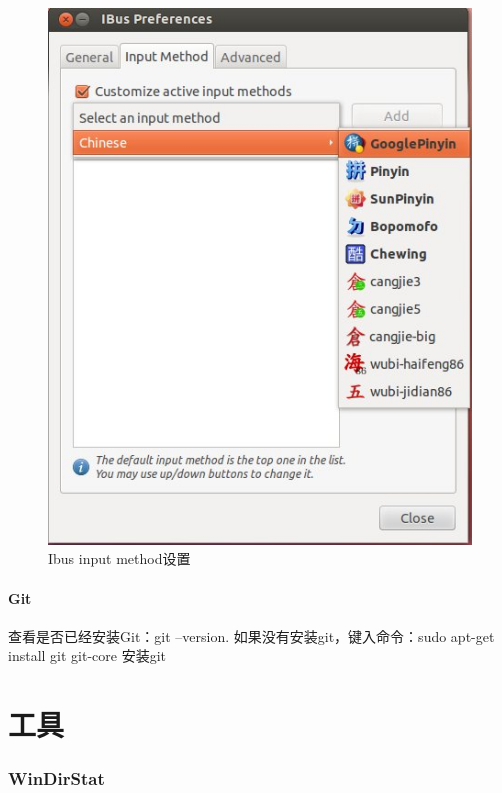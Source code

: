 \documentclass[paper=a4,fontsize=11pt]{article}
\begin{document}
\begin{enumerate}
		\begin{figure}[htbp]
			\centering
			\includegraphics[scale=0.7]{IbusSetupGooglePinyin.jpeg}
			\caption{Ibus input method设置}
			\label{IbusSetupGooglePinyin}
		\end{figure}
		
		
	\end{enumerate}
	
	\subsection{Git}
	
	查看是否已经安装Git：git --version.
	如果没有安装git，键入命令：sudo apt-get install git git-core 安装git
	
	
	
	
	
	\clearpage
		
	\part{工具}
	
	\clearpage
	
	\section{WinDirStat}
	
\end{document}
